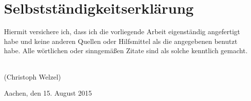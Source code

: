 \section*{Selbstständigkeitserklärung}
Hiermit versichere ich, dass ich die vorliegende Arbeit eigenständig
angefertigt habe und keine anderen Quellen oder Hilfsmittel als die angegebenen
benutzt habe. Alle wörtlichen oder sinngemäßen Zitate sind als solche
kenntlich gemacht.\\[4cm]
\begin{minipage}{0.5\textwidth}
	\makebox[1.5in]{\hrulefill}\\
	{\small(Christoph Welzel)}
\end{minipage}%
\begin{minipage}{0.5\textwidth}
	\begin{flushright}
		Aachen, den 15. August 2015
	\end{flushright}
\end{minipage}

